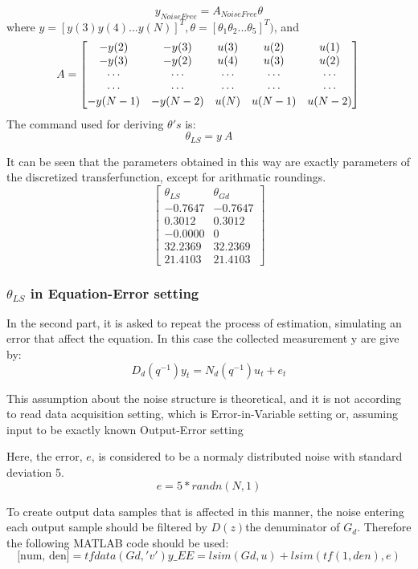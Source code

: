 \[
    y_{Noise Free} = A_{Noise Free}\theta
\]
where \(y = [y(3) y(4) ... y(N)]^T, \theta = [\theta_1 \theta_2 ... \theta_5]^T)\), and
\[
    A = \left[
    \begin{matrix}
    -y(2) & -y(3) & u(3) & u(2) & u(1) \\
    -y(3) & -y(2) & u(4) & u(3) & u(2) \\
    \cdots & \cdots & \cdots & \cdots & \cdots   \\
    \cdots & \cdots & \cdots & \cdots & \cdots   \\
    -y(N-1) & -y(N-2) & u(N) & u(N-1) & u(N-2)
    \end{matrix} 
    \right]\\
\]
The command used for deriving \(\theta's\) is:
\[
\theta_{LS} = y \ A
\]

It can be seen that the parameters obtained in this way are exactly parameters of the discretized transferfunction, except for arithmatic roundings.
\[
\begin{bmatrix}
    \theta_{LS} & \theta_{Gd} \\
    -0.7647 & -0.7647 \\
     0.3012 & 0.3012 \\
    -0.0000 & 0 \\
    32.2369 & 32.2369 \\
    21.4103 & 21.4103
\end{bmatrix}
\]

\subsubsection{\(\theta_{LS}\) in Equation-Error setting}
In the second part, it is asked to repeat the process of estimation, simulating an error that affect the equation. In this case the collected measurement y are give by:
\[
D_d(q^{-1})y_t = N_d(q^{-1})u_t + e_t
\]
\begin{QandAbox}
This assumption about the noise structure is theoretical, and it is not according to read data acquisition setting, which is Error-in-Variable setting or, assuming input to be exactly known Output-Error setting
\end{QandAbox}
Here, the error, \(e\), is considered to be a normaly distributed noise with standard deviation 5.
\[
e = 5 * randn(N,1)
\]

To create output data samples that is affected in this manner, the noise entering each output sample should be filtered by \(D(z)\)the denuminator of \(G_d\). Therefore the following MATLAB code should be used:
\[
\text{[num, den]} = tfdata(Gd, 'v')
y\_EE = lsim(Gd,u) + lsim(tf(1,den),e)
\]

